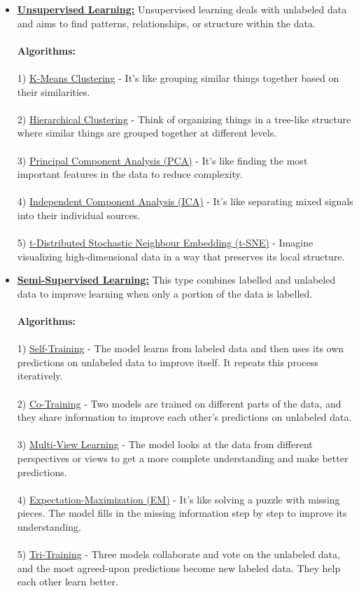 \documentclass[12pt]{article}
\begin{document}
\begin{itemize}
   \item \textbf{\underline{Unsupervised Learning:}} Unsupervised learning deals with unlabeled data and aims to find patterns, relationships, or structure within the data.
   \\\\
   \textbf{Algorithms:}
   \\\\
   1) \underline{K-Means Clustering} - It's like grouping similar things together based on their similarities.\\\\
   2) \underline{Hierarchical Clustering} - Think of organizing things in a tree-like structure where similar things are grouped together at different levels.\\\\
   3) \underline{Principal Component Analysis (PCA)} - It's like finding the most important features in the data to reduce complexity.\\\\
   4) \underline{Independent Component Analysis (ICA)} -  It's like separating mixed signals into their individual sources.\\\\
   5) \underline{t-Distributed Stochastic Neighbour Embedding (t-SNE)} - Imagine visualizing high-dimensional data in a way that preserves its local structure.\\

   \item \textbf{\underline{Semi-Supervised Learning:}} This type combines labelled and unlabeled data to improve learning when only a portion of the data is labelled.
   \\\\
   \textbf{Algorithms:}
   \\\\
   1) \underline{Self-Training} - The model learns from labeled data and then uses its own predictions on unlabeled data to improve itself. It repeats this process iteratively.\\\\
   2) \underline{Co-Training} - Two models are trained on different parts of the data, and they share information to improve each other's predictions on unlabeled data.\\\\
   3) \underline{Multi-View Learning} - The model looks at the data from different perspectives or views to get a more complete understanding and make better predictions.\\\\
   4) \underline{Expectation-Maximization (EM)} - It's like solving a puzzle with missing pieces. The model fills in the missing information step by step to improve its understanding.\\\\
   5) \underline{Tri-Training} - Three models collaborate and vote on the unlabeled data, and the most agreed-upon predictions become new labeled data. They help each other learn better.\\\\\\



\end{itemize}
\end{document}
